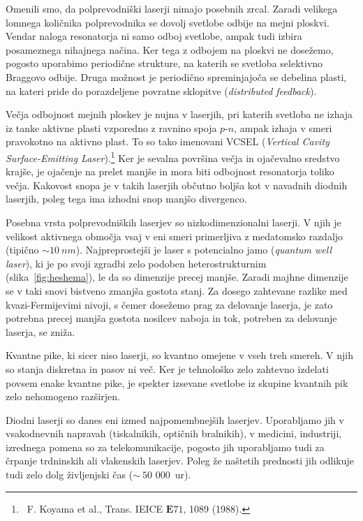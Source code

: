 \begin{remark}
Omenili smo, da polprevodniški laserji nimajo posebnih zrcal. Zaradi velikega lomnega
količnika polprevodnika se dovolj svetlobe odbije na mejni ploskvi. Vendar naloga resonatorja ni 
samo odboj svetlobe, ampak tudi izbira posameznega nihajnega načina. Ker tega z odbojem 
na ploskvi ne dosežemo, pogosto uporabimo periodične strukture, na katerih se svetloba selektivno
Braggovo odbije. Druga možnost je periodično spreminjajoča se debelina plasti, na kateri pride
do porazdeljene povratne sklopitve ({\it distributed feedback}). 
 
Večja odbojnost mejnih ploskev je nujna v laserjih, pri katerih svetloba ne izhaja iz
tanke aktivne plasti vzporedno z ravnino spoja $p$-$n$, ampak izhaja v smeri pravokotno na aktivno plast.
To so tako imenovani VCSEL ({\it Vertical Cavity Surface-Emitting 
Laser}).\footnote{~F. Koyama et al., Trans. IEICE ${\mathbf E71}$, 1089 (1988).} Ker je sevalna površina večja in 
ojačevalno sredstvo krajše, je ojačenje na prelet manjše in mora biti odbojnost resonatorja toliko večja. 
Kakovost snopa je v takih laserjih občutno boljša kot v navadnih diodnih laserjih, poleg tega ima izhodni 
snop manjšo divergenco.
\end{remark}

\begin{remark}
Posebna vrsta polprevodniških laserjev so nizkodimenzionalni laserji. V njih je 
velikost aktivnega območja vsaj v eni smeri primerljiva z medatomsko razdaljo (tipično $\sim 10~\si{nm}$).
Najpreprostejši je laser s potencialno jamo ({\it quantum well laser}), ki 
je po svoji zgradbi zelo podoben heterostrukturnim (slika~\ref{fig:heshema}), le da so dimenzije precej
manjše. Zaradi majhne dimenzije se v taki snovi bistveno zmanjša gostota stanj. 
Za dosego zahtevane razlike med kvazi-Fermijevimi nivoji, s čemer dosežemo prag za delovanje laserja,
je zato potrebna precej manjša gostota nosilcev naboja in tok, potreben za delovanje laserja,
se zniža. 

Kvantne pike, ki sicer niso laserji, so kvantno omejene v vseh treh smereh.
V njih so stanja diskretna in pasov ni več. Ker je tehnološko zelo zahtevno izdelati povsem enake
kvantne pike, je spekter izsevane svetlobe iz skupine kvantnih pik zelo nehomogeno razširjen. 
\end{remark}

Diodni laserji so danes eni izmed najpomembnejših laserjev. Uporabljamo jih v vsakodnevnih napravah 
(tiskalnikih, optičnih bralnikih), v medicini, industriji, izrednega
pomena so za telekomunikacije, pogosto jih uporabljamo tudi za 
črpanje trdninskih ali vlakenskih laserjev. 
Poleg že naštetih prednosti jih odlikuje tudi zelo dolg življenjski čas ($\sim~50\,\,000$~ur). 

